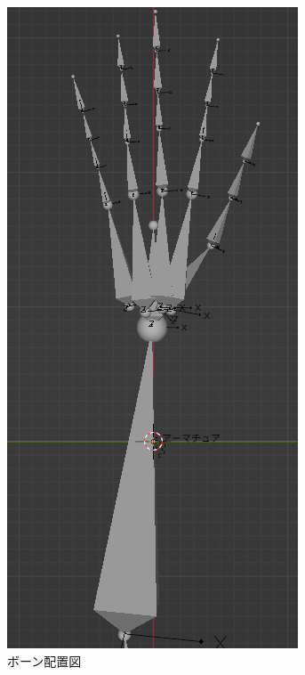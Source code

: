 \documentclass{ltjsreport}
\begin{document}
\begin{figure}[H]
\begin{minipage}{0.3\columnwidth}
			\end{minipage}
			\begin{minipage}{0.3\columnwidth}
			\centering
			\includegraphics[width = \columnwidth]{../figs/handboneLat.png}
			\end{minipage}
			\caption{ボーン配置図}
			\end{figure}
\end{document}
